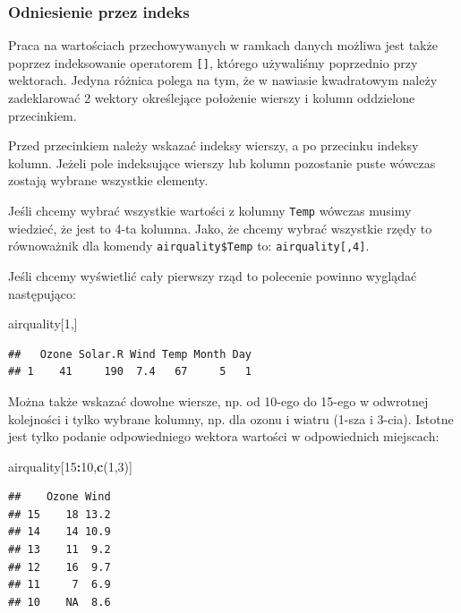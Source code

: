 \documentclass[]{book}
\newenvironment{Shaded}{\begin{snugshade}}{\end{snugshade}}
\newcommand{\KeywordTok}[1]{\textcolor[rgb]{0.13,0.29,0.53}{\textbf{#1}}}
\newcommand{\DecValTok}[1]{\textcolor[rgb]{0.00,0.00,0.81}{#1}}
\newcommand{\OperatorTok}[1]{\textcolor[rgb]{0.81,0.36,0.00}{\textbf{#1}}}
\newcommand{\NormalTok}[1]{#1}
\theoremstyle{definition}
\theoremstyle{definition}
\theoremstyle{definition}
\theoremstyle{remark}
\begin{document}
\subsubsection{Odniesienie przez indeks}\label{odniesienie-przez-indeks}

Praca na wartościach przechowywanych w ramkach danych możliwa jest także
poprzez indeksowanie operatorem \texttt{{[}{]}}, którego używaliśmy
poprzednio przy wektorach. Jedyna różnica polega na tym, że w nawiasie
kwadratowym należy zadeklarować 2 wektory określejące położenie wierszy
i kolumn oddzielone przecinkiem.

Przed przecinkiem należy wskazać indeksy wierszy, a po przecinku indeksy
kolumn. Jeżeli pole indeksujące wierszy lub kolumn pozostanie puste
wówczas zostają wybrane wszystkie elementy.

Jeśli chcemy wybrać wszystkie wartości z kolumny \texttt{Temp} wówczas
musimy wiedzieć, że jest to 4-ta kolumna. Jako, że chcemy wybrać
wszystkie rzędy to równoważnik dla komendy \texttt{airquality\$Temp} to:
\texttt{airquality{[},4{]}}.

Jeśli chcemy wyświetlić cały pierwszy rząd to polecenie powinno wyglądać
następująco:

\begin{Shaded}
\begin{Highlighting}[]
\NormalTok{airquality[}\DecValTok{1}\NormalTok{,]}
\end{Highlighting}
\end{Shaded}

\begin{verbatim}
##   Ozone Solar.R Wind Temp Month Day
## 1    41     190  7.4   67     5   1
\end{verbatim}

Można także wskazać dowolne wiersze, np. od 10-ego do 15-ego w odwrotnej
kolejności i tylko wybrane kolumny, np. dla ozonu i wiatru (1-sza i
3-cia). Istotne jest tylko podanie odpowiedniego wektora wartości w
odpowiednich miejscach:

\begin{Shaded}
\begin{Highlighting}[]
\NormalTok{airquality[}\DecValTok{15}\OperatorTok{:}\DecValTok{10}\NormalTok{,}\KeywordTok{c}\NormalTok{(}\DecValTok{1}\NormalTok{,}\DecValTok{3}\NormalTok{)]}
\end{Highlighting}
\end{Shaded}

\begin{verbatim}
##    Ozone Wind
## 15    18 13.2
## 14    14 10.9
## 13    11  9.2
## 12    16  9.7
## 11     7  6.9
## 10    NA  8.6
\end{verbatim}
\end{document}
